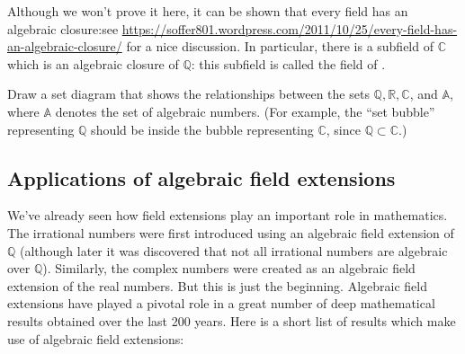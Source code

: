 Although we won't prove it here, it can be shown that every field has an algebraic closure:see  \url{https://soffer801.wordpress.com/2011/10/25/every-field-has-an-algebraic-closure/} for a nice discussion. In particular, there is a subfield of $\mathbb{C}$ which is an algebraic closure of $\mathbb{Q}$: this subfield is called the field of .

\begin{exercise}{}
Draw a set diagram that shows the relationships between the sets $\mathbb{Q}, \mathbb{R}, \mathbb{C}$, and $\mathbb{A}$, where $\mathbb{A}$ denotes the set of algebraic numbers.  (For example, the ``set bubble'' representing $\mathbb{Q}$ should be inside the bubble representing $\mathbb{C}$, since $\mathbb{Q} \subset \mathbb{C}$.)
\end{exercise}

\subsection{Applications of algebraic field extensions}

We've already seen how field extensions play an important role in mathematics.  The irrational numbers were first introduced using an algebraic  field extension  of $\mathbb{Q}$  (although later it was discovered that not all irrational numbers are algebraic over $\mathbb{Q}$).  Similarly, the complex numbers were created as an algebraic field extension of the real numbers.  But this is just the beginning. Algebraic field extensions have played a pivotal role in a great number of deep mathematical results obtained over the last 200 years. Here is a short list of results which make use of algebraic field extensions:

